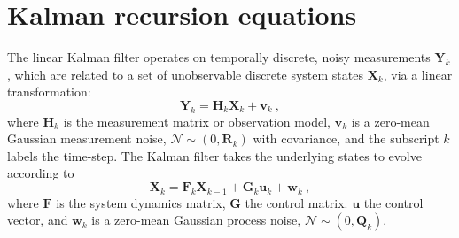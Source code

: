 \documentclass[fleqn,usenatbib,useAMS]{mnras}
\begin{document}
\appendix

\section{Kalman recursion equations} \label{sec:kalman}
The linear Kalman filter operates on temporally discrete, noisy measurements $\boldsymbol{Y}_k$, which are related to a set of unobservable discrete system states $\boldsymbol{X}_k$, via a linear transformation:
\begin{equation}
	\boldsymbol{Y}_k = \boldsymbol{H}_k \boldsymbol{X}_k + \boldsymbol{v}_k \ ,\label{eq:kalman1}
\end{equation}
where $\boldsymbol{H}_k$ is the measurement matrix or observation model, $\boldsymbol{v}_k$ is a zero-mean Gaussian measurement noise, $\mathcal{N} \sim (0,\boldsymbol{R}_k)$ with covariance, and the subscript $k$ labels the time-step. The Kalman filter takes the underlying states to evolve according to
\begin{equation}
	\boldsymbol{X}_k = \boldsymbol{F}_k \boldsymbol{X}_{k-1} + \boldsymbol{G}_k \boldsymbol{u}_k + \boldsymbol{w}_k \ , \label{eq:kalman2}
\end{equation}
where $\boldsymbol{F}$ is the system dynamics matrix, $\boldsymbol{G}$ the control matrix. $\boldsymbol{u}$ the control vector, and $\boldsymbol{w}_k$ is a zero-mean Gaussian process noise, $\mathcal{N} \sim (0,\boldsymbol{Q}_k)$. \newline 
\end{document}
